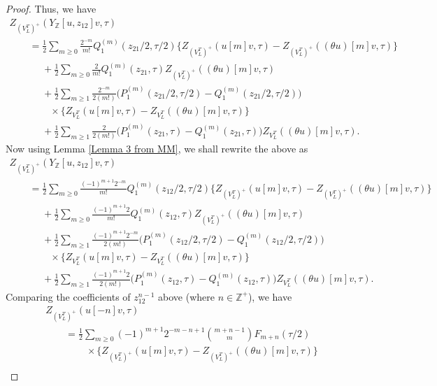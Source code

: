 \documentclass[10pt,a4paper]{amsart}
\begin{document}
\begin{proof}
Thus, we have
\begin{gather*}
Z_{(V_L^T)^+}(Y_{\mathbb{Z}}[u,z_{12}]v,\tau)\\
\qquad=\frac{1}{2}\sum_{m\geq 0}\frac{2^{-m}}{m!} Q_1^{(m)}(z_{21}/2,\tau/2)\{ Z_{(V_L^T)^+}(u[m]v,\tau) - Z_{(V_L^T)^+}((\theta u)[m]v,\tau)\}\\
\phantom{\qquad=}{}+\frac{1}{2}\sum_{m\geq 0}\frac{2}{m!} Q_1^{(m)}(z_{21},\tau) Z_{(V_L^T)^+}((\theta u)[m]v,\tau)\\
\phantom{\qquad=}{}+\frac{1}{2}\sum_{m\geq 1}\frac{2^{-m}}{2(m!)}\bigl( P_1^{(m)}(z_{21}/2,\tau/2)-Q_1^{(m)}(z_{21}/2,\tau/2)\bigr)\\
\phantom{\qquad=+}{}\times\{Z_{V_L^T}(u[m]v, \tau)-Z_{V_L^T}((\theta u)[m]v, \tau)\}\\
\phantom{\qquad=}{}+\frac{1}{2}\sum_{m\geq 1}\frac{2}{2(m!)}\bigl( P_1^{(m)}(z_{21},\tau)-Q_1^{(m)}(z_{21},\tau)\bigr)Z_{V_L^T}((\theta u)[m]v, \tau).\end{gather*}
Now using Lemma \ref{Lemma 3 from MM}, we shall rewrite the above as
\begin{gather*}
Z_{(V_L^T)^+}(Y_{\mathbb{Z}}[u,z_{12}]v,\tau)\\
\qquad=\frac{1}{2}\sum_{m\geq 0}\frac{(-1)^{m+1}2^{-m}}{m!} Q_1^{(m)}(z_{12}/2,\tau/2)\{ Z_{(V_L^T)^+}(u[m]v,\tau) - Z_{(V_L^T)^+}((\theta u)[m]v,\tau)\}\\
\phantom{\qquad=}{}+\frac{1}{2}\sum_{m\geq 0}\frac{(-1)^{m+1}2}{m!} Q_1^{(m)}(z_{12},\tau) Z_{(V_L^T)^+}((\theta u)[m]v,\tau)\\
\phantom{\qquad=}{}+ \frac{1}{2} \sum_{m \geq 1} \frac{(-1)^{m+1} 2^{-m}}{2(m!)} \bigl( P_1^{(m)}(z_{12}/2, \tau/2) - Q_1^{(m)}(z_{12}/2, \tau/2) \bigr)\\
\phantom{\qquad=+}{}\times \{ Z_{V_L^T}(u[m] v, \tau) - Z_{V_L^T} ( (\theta u)[m] v, \tau ) \}
\\
\phantom{\qquad=}{}+\frac{1}{2}\sum_{m\geq 1}\frac{(-1)^{m+1}2}{2(m!)}\bigl( P_1^{(m)}(z_{12},\tau)-Q_1^{(m)}(z_{12},\tau)\bigr)Z_{V_L^T}((\theta u)[m]v, \tau).
\end{gather*}
Comparing the coefficients of $z_{12}^{n-1}$ above (where $n\in \mathbb{Z}^+$), we have
\begin{gather*}
Z_{(V_L^T)^+}(u[-n]v,\tau)\\
\qquad=\frac{1}{2}\sum_{m\geq 0}(-1)^{m+1}2^{-m-n+1}\binom{m+n-1}{m}F_{m+n}(\tau/2)\\
\phantom{\qquad=+}{}\times \{ Z_{(V_L^T)^+}(u[m]v,\tau) - Z_{(V_L^T)^+}((\theta u)[m]v,\tau)\}\\

\end{gather*}
\end{proof}
\end{document}
